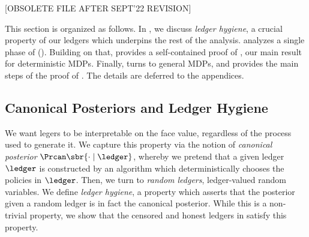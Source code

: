 [OBSOLETE FILE AFTER SEPT'22 REVISION]



This section is organized as follows. In , we discuss \emph{ledger hygiene}, a crucial property of our ledgers which underpins the rest of the analysis.  analyzes a single phase of \mdphh (). Building on that,  provides a self-contained proof of , our main result for deterministic MDPs. Finally,  turns to general MDPs, and  provides the main steps of the proof of . The details are deferred to the appendices.

\subsection{Canonical Posteriors and Ledger Hygiene}
\label{sec:canon}

We want legers to be interpretable on the face value, regardless of the process used to generate it. We capture this property via the notion of \emph{canonical posterior} $\Prcan\sbr{ \cdot \mid \ledger }$, whereby we pretend that a given ledger $\ledger$ is constructed by an algorithm which deterministically chooses the policies in $\ledger$. Then, we turn to \emph{random ledgers}, \ie ledger-valued random variables. We define \emph{ledger hygiene}, a  property which asserts that the posterior given a random ledger is in fact the canonical posterior. While this is a non-trivial property, we show that the censored and honest ledgers in \mdphh satisfy this property.


